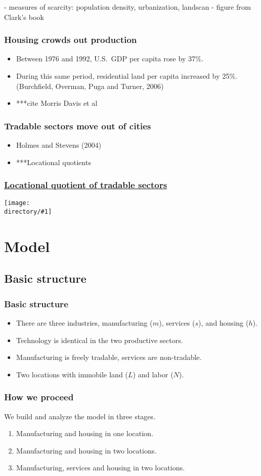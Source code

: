 \documentclass[compress,mathserif]{beamer}
\newcommand{\directory}{figures}
\newcommand{\widefigure}[2]{\begin{frame}\frametitle{\hyperlink{#1back}{#2}}\hypertarget{#1}{{\begin{center}\texttt{[image: \\directory/\#1]}\end{center}}}\end{frame}}
\begin{document}
- measures of scarcity: population density, urbanization, landscan -
figure from Clark's book

\begin{frame}\frametitle{Housing crowds out production}
\begin{itemize}
    \item Between 1976 and 1992, U.S.~GDP per capita rose by 37\%.
    \item During this same period, residential land per capita increased by 25\%. (Burchfield, Overman, Puga and Turner, 2006)
    \item ***cite Morris Davis et al
\end{itemize}
\end{frame}

\begin{frame}\frametitle{Tradable sectors move out of cities}
\begin{itemize}
    \item Holmes and Stevens (2004)
    \item ***Locational quotients
\end{itemize}
\end{frame}

\widefigure{LQ_map}{Locational quotient of tradable sectors}

\section{Model}
\subsection{Basic structure}
\begin{frame}\frametitle{Basic structure}
\begin{itemize}
    \item There are three industries, manufacturing ($m$), services ($s$), and housing ($h$).
    \item Technology is identical in the two productive sectors.
    \item Manufacturing is freely tradable, services are non-tradable.
    \item Two locations with immobile land ($L$) and labor ($N$).
\end{itemize}
\end{frame}

\begin{frame}\frametitle{How we proceed}
We build and analyze the model in three stages.
\begin{enumerate}
    \item Manufacturing and housing in one location.
    \item Manufacturing and housing in two locations.
    \item Manufacturing, services and housing in two locations.
\end{enumerate}
\end{frame}
\end{document}
